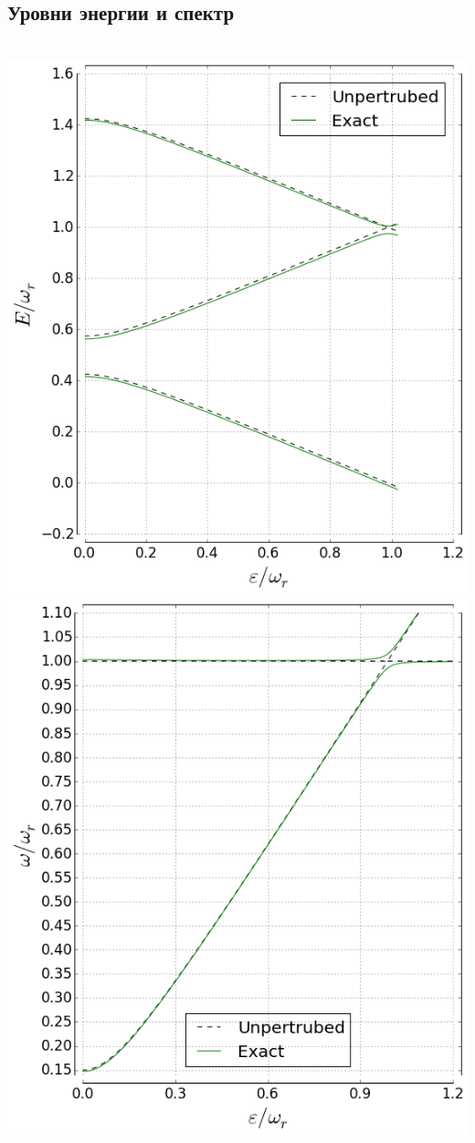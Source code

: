 \documentclass[aspectratio=169, 13pt]{beamer}
\begin{document}
\subsection{Уровни энергии и спектр}

\begin{frame}[c]\frametitle{\secname}\framesubtitle{\subsecname}
\begin{columns}[c]
\includegraphics[height=0.85\textheight]{Rabi_levels}
\includegraphics[height=0.85\textheight]{Rabi_spectrum}

\end{columns}
\end{frame}
\end{document}
